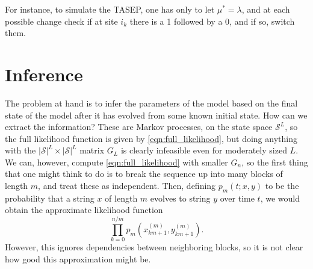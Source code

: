 \documentclass{article}
\newcommand{\peter}[1]{\todo[color=green!40]{Peter: #1}}
\newcommand{\calS}{\mathcal{S}}  %
\theoremstyle{plain}
\theoremstyle{definition}
\begin{document}
For instance, to simulate the TASEP, one has only to let $\mu^*=\lambda$,
and at each possible change
check if at site $i_k$ there is a 1 followed by a 0,
and if so, switch them.


\section{Inference}

\peter{refer to figure}

The problem at hand is to infer the parameters of the model based on the final state of the model after it has evolved from some known initial state.
How can we extract the information?
These are Markov processes, on the state space $\calS^L$,
so the full likelihood function is given by \eqref{eqn:full_likelihood},
but doing anything with the $|\calS|^L \times |\calS|^L$ matrix $G_L$ is clearly infeasible even for moderately sized $L$.
We can, however, compute \eqref{eqn:full_likelihood} with smaller $G_n$,
so the first thing that one might think to do is to break the sequence up into many blocks of length $m$,
and treat these as independent.
Then, defining $p_m(t;x,y)$ to be the probability that a string $x$ of length $m$ evolves to string $y$ over time $t$,
we would obtain the approximate likelihood function
\[
  \prod_{k=0}^{n/m} p_m(x_{km+1}^{(m)},y_{km+1}^{(m)}) .
\]
However, this ignores dependencies between neighboring blocks,
so it is not clear how good this approximation might be.
\end{document}
